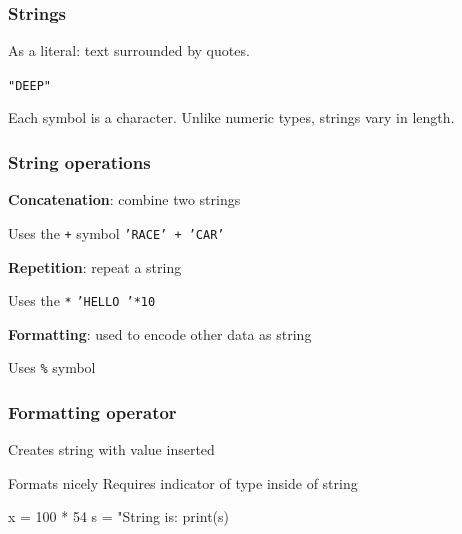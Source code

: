 \documentclass[11pt]{beamer}
\begin{document}
\begin{frame}
  \frametitle{Strings}
  \Enlarge

  \begin{itemize}
  \myitem  As a literal:  text surrounded by quotes.
    \begin{itemize}
    \mysubitem  \texttt{"DEEP"}
    \end{itemize} \pause
  \myitem  Each symbol is a character. \pause
  \myitem  Unlike numeric types, strings vary in length.
  \end{itemize}
\end{frame}

\begin{frame}
  \frametitle{String operations}
  \Enlarge

  \begin{itemize}
  \myitem  \textbf{Concatenation}:  combine two strings
    \begin{itemize}
    \mysubitem  Uses the \texttt{+} symbol
    \mysubitem  \texttt{'RACE' + 'CAR'}
    \end{itemize} \pause
  \myitem  \textbf{Repetition}:  repeat a string
    \begin{itemize}
    \mysubitem  Uses the \texttt{*}
    \mysubitem  \texttt{'HELLO '*10}
    \end{itemize} \pause
  \myitem  \textbf{Formatting}:  used to encode other data as string
    \begin{itemize}
    \mysubitem  Uses \texttt{\%} symbol
    \end{itemize}
  \end{itemize}
\end{frame}

\begin{frame}[fragile]
  \frametitle{Formatting operator}
  \Enlarge

  \begin{itemize}
  \myitem  Creates string with value inserted \pause
    \begin{itemize}
    \mysubitem  Formats nicely
    \mysubitem  Requires indicator of type inside of string
    \end{itemize} \pause
  \begin{semiverbatim}
x = 100 * 54
s = "String is: %
print(s)
  \end{semiverbatim}
  \end{itemize}
\end{frame}
\end{document}
